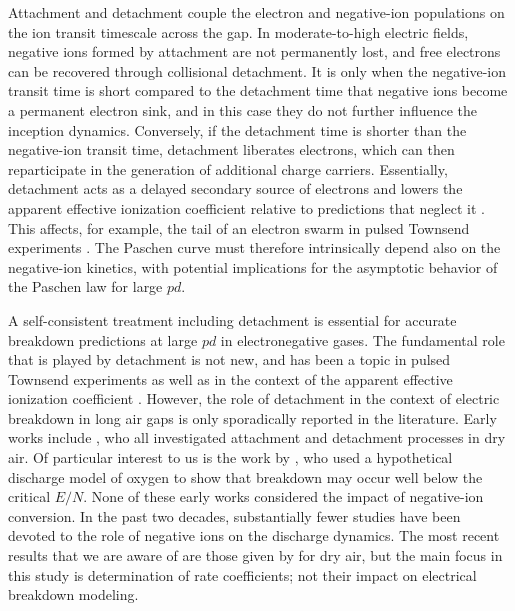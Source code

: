 \documentclass{iopjournal}
\begin{document}
Attachment and detachment couple the electron and negative-ion populations on the ion transit timescale across the gap.
In moderate-to-high electric fields, negative ions formed by attachment are not permanently lost, and free electrons can be recovered through collisional detachment.
It is only when the negative-ion transit time is short compared to the detachment time that negative ions become a permanent electron sink, and in this case they do not further influence the inception dynamics.
Conversely, if the detachment time is shorter than the negative-ion transit time, detachment liberates electrons, which can then reparticipate in the generation of additional charge carriers.
Essentially, detachment acts as a delayed secondary source of electrons and lowers the apparent effective ionization coefficient relative to predictions that neglect it \cite{Pancheshnyi2013,Hsl2017, Haefliger2018, Hosl2019}.
This affects, for example, the tail of an electron swarm in pulsed Townsend experiments \cite{Wen1988}.
The Paschen curve must therefore intrinsically depend also on the negative-ion kinetics, with potential implications for the asymptotic behavior of the Paschen law for large $pd$.

A self-consistent treatment including detachment is essential for accurate breakdown predictions at large $pd$ in electronegative gases.
The fundamental role that is played by detachment is not new, and has been a topic in pulsed Townsend experiments \cite{Wen1988,Hsl2017, Haefliger2018, Hosl2019} as well as in the context of the apparent effective ionization coefficient \cite{Pancheshnyi2013,Zhao2016}.
However, the role of detachment in the context of electric breakdown in long air gaps is only sporadically reported in the literature.
Early works include \textcite{Frommhold1964, Ryzko1967, Teich1991}, who all investigated attachment and detachment processes in dry air.
Of particular interest to us is the work by \textcite{Teich1991}, who used a hypothetical discharge model of oxygen to show that breakdown may occur well below the critical $E/N$.
None of these early works considered the impact of negative-ion conversion.
In the past two decades, substantially fewer studies have been devoted to the role of negative ions on the discharge dynamics.
The most recent results that we are aware of are those given by \textcite{Hsl2017} for dry air, but the main focus in this study is determination of rate coefficients; not their impact on electrical breakdown modeling.
\end{document}
